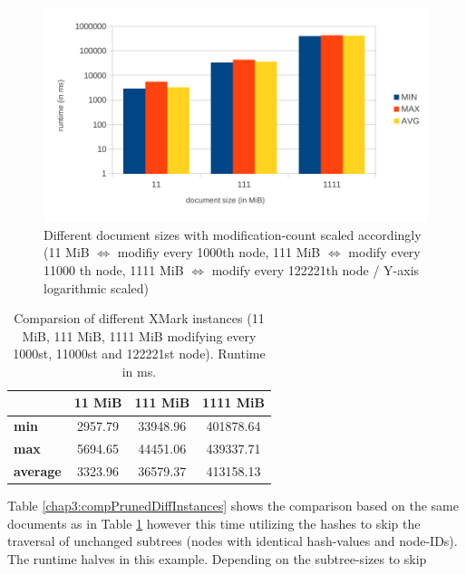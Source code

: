 \begin{figure}[tb]
\centering
\includegraphics[width=\textwidth]{figures/diff-docsize-scale}
\caption{Different document sizes with modification-count scaled accordingly (11 MiB $\Leftrightarrow$ modifiy every 1000th node, 111 MiB $\Leftrightarrow$ modify every 11000 th node, 1111 MiB $\Leftrightarrow$ modify every 122221th node / Y-axis logarithmic scaled)} 
\label{fig:docScaling}
\end{figure}

\begin{table}[tb]
\centering 
\begin{tabular}[r]{|l|c|c|c|} 
\hline
& \textbf{11 MiB} & \textbf{111 MiB} & \textbf{1111 MiB}\\
\hline
\hline
\textbf{min} & 2957.79 & 33948.96 & 401878.64\\
\hline
\textbf{max} & 5694.65 & 44451.06 & 439337.71\\
\hline
\textbf{average} & 3323.96 & 36579.37 & 413158.13\\
\hline
\end{tabular}
\label{chap3:compDiffInstances}
\vspace{0.5em} 
\caption{Comparsion of different XMark instances (11 MiB, 111 MiB, 1111 MiB modifying every 1000st, 11000st and 122221st node). Runtime in ms.}
\end{table}

Table \ref{chap3:compPrunedDiffInstances} shows the comparison based on the same documents as in Table \ref{chap3:compDiffInstances} however this time utilizing the hashes to skip the traversal of unchanged subtrees (nodes with identical hash-values and node-IDs). The runtime halves in this example. Depending on the subtree-sizes to skip

